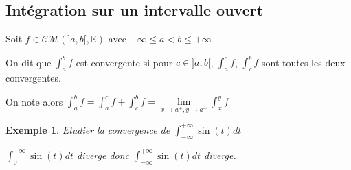 \documentclass[a4paper,12pt]{book}
\newcommand{\Def}[2]{\begin{tcolorbox}[sharp corners, colback=white,colframe=blue!90!black!75, title=Définition : #1]#2\end{tcolorbox}}
\newtheorem{Exe}{Exemple}[section]
\def\K{\mathbb{K}}
\begin{document}
\subsection{Intégration sur un intervalle ouvert}
\Def{Intégrale sur un intervalle ouvert}{Soit $f\in\mathcal{CM}(]a,b[,\K)$ avec $-\infty\leq a<b\leq +\infty$
\par On dit que $\int_a^bf$ est convergente si pour $c\in]a,b[$, $\int_a^cf$, $\int_c^bf$ sont toutes les deux convergentes. \par On note alors $\int_a^bf = \int_a^cf + \int_c^bf = \lim\limits_{x\to a^+, y\to a^-}\int_x^yf$}
\begin{Exe}
Etudier la convergence de $\int_{-\infty}^{+\infty}\sin(t)dt$ \par $\int_0^{+\infty}\sin(t)dt$ diverge donc $\int_{-\infty}^{+\infty}\sin(t)dt$ diverge.
\end{Exe}
\end{document}
